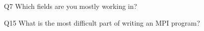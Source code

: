 \begin{description}%
\item{Q7} Which fields are you mostly working in?%
\item{Q15} What is the most difficult part of writing an MPI program?%
\end{description}%
